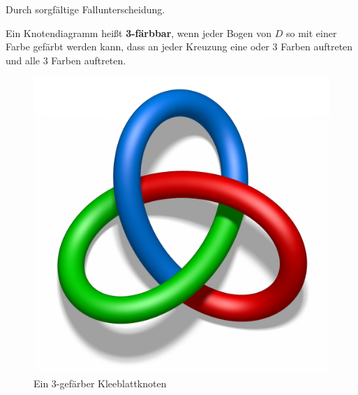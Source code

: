 \begin{beweis}
    Durch sorgfältige Fallunterscheidung.
\end{beweis}

\begin{definition}
    Ein Knotendiagramm heißt \textbf{3-färbbar}, 
    wenn jeder Bogen von $D$ so mit einer Farbe gefärbt werden kann, 
    dass an jeder Kreuzung eine oder 3 Farben auftreten und alle 3 
    Farben auftreten.
\end{definition}

\begin{figure}[htp]
    \centering
    \includegraphics[height=0.3\linewidth, keepaspectratio]{figures/tricoloring.png} 

    \caption{Ein 3-gefärber Kleeblattknoten}
    \label{fig:treefoil-knot-three-colors}
\end{figure}


